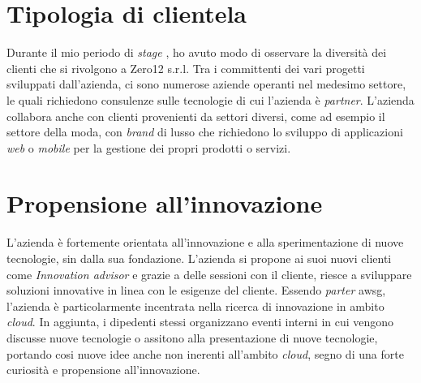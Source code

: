 

\section{Tipologia di clientela}
Durante il mio periodo di \textit{stage} , ho avuto modo di osservare la diversità dei clienti che si rivolgono a Zero12 s.r.l. Tra i committenti dei vari progetti sviluppati dall'azienda, ci sono numerose aziende operanti nel medesimo settore, le quali richiedono consulenze sulle tecnologie di cui l'azienda è \textit{partner}.
L'azienda collabora anche con clienti provenienti da settori diversi, come ad esempio il settore della moda, con \textit{brand} di lusso che richiedono lo sviluppo di applicazioni \textit{web} o \textit{mobile} per la gestione dei propri prodotti o servizi.

\section{Propensione all'innovazione}
L'azienda è fortemente orientata all'innovazione e alla sperimentazione di nuove tecnologie, sin dalla sua fondazione.
L'azienda si propone ai suoi nuovi clienti come \textit{Innovation advisor} e grazie a delle sessioni con il cliente, riesce a sviluppare soluzioni innovative in linea con le esigenze del cliente. Essendo \textit{parter} \gls{awsg}, l'azienda è particolarmente incentrata nella ricerca di innovazione in ambito \textit{cloud}.
In aggiunta, i dipedenti stessi organizzano eventi interni in cui vengono discusse nuove tecnologie o assitono alla presentazione di nuove tecnologie, portando cosi nuove idee anche non inerenti all'ambito \textit{cloud}, segno di una forte curiosità e propensione all'innovazione.


    
